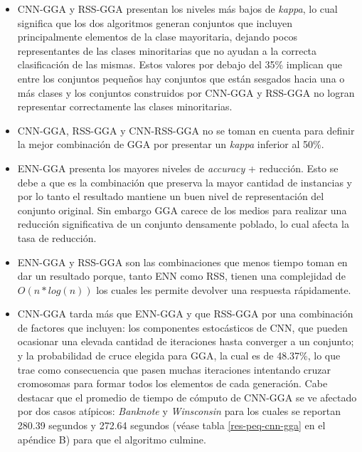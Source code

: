 \begin{itemize}

\item CNN-GGA y RSS-GGA presentan los niveles más bajos de \emph{kappa}, lo cual significa que los dos algoritmos generan conjuntos que incluyen principalmente elementos de la clase mayoritaria, dejando pocos representantes de las clases minoritarias que no ayudan a la correcta clasificación de las mismas. Estos valores por debajo del 35\% implican que entre los conjuntos pequeños hay conjuntos que están sesgados hacia una o más clases y los conjuntos construidos por CNN-GGA y RSS-GGA no logran representar correctamente las clases minoritarias.

\item CNN-GGA, RSS-GGA y CNN-RSS-GGA no se toman en cuenta para definir la mejor combinación de GGA por presentar un \emph{kappa} inferior al 50\%.

\item{ENN-GGA} presenta los mayores niveles de \emph{accuracy} + reducción. Esto se debe a que es la combinación que preserva la mayor cantidad de instancias y por lo tanto el resultado mantiene un buen nivel de representación del conjunto original. Sin embargo GGA carece de los medios para realizar una reducción significativa de un conjunto densamente poblado, lo cual afecta la tasa de reducción.

\item ENN-GGA y RSS-GGA son las combinaciones que menos tiempo toman en dar un resultado porque, tanto ENN como RSS, tienen una complejidad de $O(n*log(n))$ los cuales les permite devolver una respuesta rápidamente.

\item CNN-GGA tarda más que ENN-GGA y que RSS-GGA por una combinación de factores que incluyen: los componentes estocásticos de CNN, que pueden ocasionar una elevada cantidad de iteraciones hasta converger a un conjunto; y la probabilidad de cruce elegida para GGA, la cual es de 48.37\%, lo que trae como consecuencia que pasen muchas iteraciones intentando cruzar cromosomas para formar todos los elementos de cada generación. Cabe destacar que el promedio de tiempo de cómputo de CNN-GGA se ve afectado por dos casos atípicos: \emph{Banknote} y \emph{Winsconsin} para los cuales se reportan 280.39 segundos y 272.64 segundos (véase tabla \ref{res-peq-cnn-gga} en el apéndice B) para que el algoritmo culmine.

\end{itemize}

